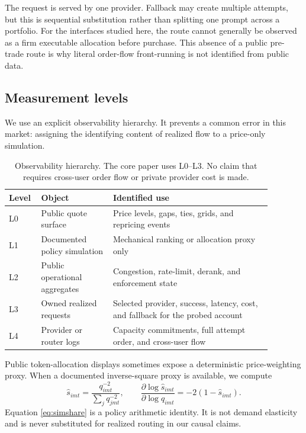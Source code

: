 \documentclass[11pt]{article}
\newcommand{\1}{\mathbf{1}}
\begin{document}
The request is served by one provider.  Fallback may create multiple attempts,
but this is sequential substitution rather than splitting one prompt across a
portfolio.  For the interfaces studied here, the route cannot generally be
observed as a firm executable allocation before purchase.  This absence of a
public pre-trade route is why literal order-flow front-running is not identified
from public data.

\subsection{Measurement levels}

We use an explicit observability hierarchy.  It prevents a common error in this
market: assigning the identifying content of realized flow to a price-only
simulation.

\begin{table}[H]
\centering
\small
\begin{tabular}{p{0.08\linewidth}p{0.25\linewidth}p{0.55\linewidth}}
\toprule
Level & Object & Identified use \\
\midrule
L0 & Public quote surface & Price levels, gaps, ties, grids, and repricing events \\
L1 & Documented policy simulation & Mechanical ranking or allocation proxy only \\
L2 & Public operational aggregates & Congestion, rate-limit, derank, and enforcement state \\
L3 & Owned realized requests & Selected provider, success, latency, cost, and fallback for the probed account \\
L4 & Provider or router logs & Capacity commitments, full attempt order, and cross-user flow \\
\bottomrule
\end{tabular}
\caption{Observability hierarchy.  The core paper uses L0--L3.  No claim that
requires cross-user order flow or private provider cost is made.}
\label{tab:levels}
\end{table}

Public token-allocation displays sometimes expose a deterministic price-weighting
proxy.  When a documented inverse-square proxy is available, we compute
\begin{equation}
  \widehat{s}_{imt}=\frac{q_{imt}^{-2}}{\sum_j q_{jmt}^{-2}}, \qquad
  \frac{\partial\log\widehat{s}_{imt}}{\partial\log q_{imt}}
  =-2(1-\widehat{s}_{imt}).
  \label{eq:simshare}
\end{equation}
Equation \eqref{eq:simshare} is a policy arithmetic identity.  It is not demand
elasticity and is never substituted for realized routing in our causal claims.
\end{document}

